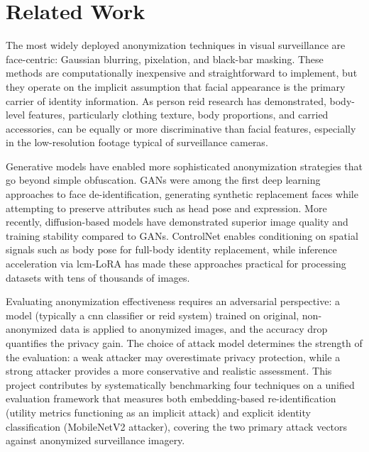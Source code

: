 \section{Related Work}

The most widely deployed anonymization techniques in visual surveillance are face-centric: Gaussian blurring, pixelation, and black-bar masking. These methods are computationally inexpensive and straightforward to implement, but they operate on the implicit assumption that facial appearance is the primary carrier of identity information. As person \acrshort{reid} research has demonstrated, body-level features, particularly clothing texture, body proportions, and carried accessories, can be equally or more discriminative than facial features, especially in the low-resolution footage typical of surveillance cameras.

Generative models have enabled more sophisticated anonymization strategies that go beyond simple obfuscation. GANs were among the first deep learning approaches to face de-identification, generating synthetic replacement faces while attempting to preserve attributes such as head pose and expression. More recently, diffusion-based models \cite{rombach2022ldm} have demonstrated superior image quality and training stability compared to GANs. ControlNet \cite{zhang2023controlnet} enables conditioning on spatial signals such as body pose for full-body identity replacement, while inference acceleration via \acrshort{lcm}-LoRA \cite{luo2023lcm} has made these approaches practical for processing datasets with tens of thousands of images.

Evaluating anonymization effectiveness requires an adversarial perspective: a model (typically a \acrshort{cnn} classifier or \acrshort{reid} system) trained on original, non-anonymized data is applied to anonymized images, and the accuracy drop quantifies the privacy gain. The choice of attack model determines the strength of the evaluation: a weak attacker may overestimate privacy protection, while a strong attacker provides a more conservative and realistic assessment. This project contributes by systematically benchmarking four techniques on a unified evaluation framework that measures both embedding-based re-identification (utility metrics functioning as an implicit attack) and explicit identity classification (MobileNetV2 attacker), covering the two primary attack vectors against anonymized surveillance imagery.
